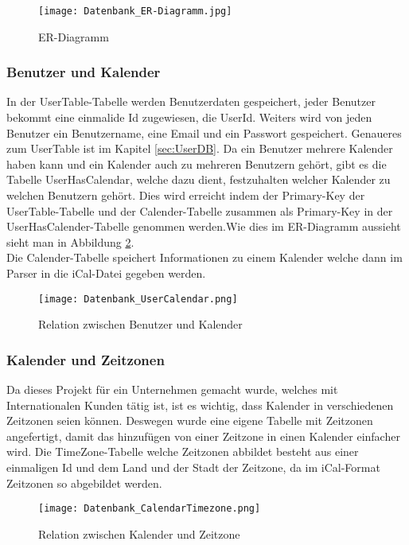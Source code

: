 \begin{figure}[H]
	\texttt{[image: Datenbank\_ER-Diagramm.jpg]}
    \caption{ER-Diagramm}
    \label{fig:erDiagramm}
\end{figure}

\subsubsection*{Benutzer und Kalender}
\label{ref:benutzerKalender}
In der UserTable-Tabelle werden Benutzerdaten gespeichert, jeder Benutzer bekommt eine einmalide Id zugewiesen, die UserId. Weiters wird von jeden Benutzer ein Benutzername, eine Email und ein Passwort gespeichert. Genaueres zum UserTable ist im Kapitel \ref{sec:UserDB}. Da ein Benutzer mehrere Kalender haben kann und ein Kalender auch zu mehreren Benutzern gehört, gibt es die Tabelle UserHasCalendar, welche dazu dient, festzuhalten welcher Kalender zu welchen Benutzern gehört. Dies wird erreicht indem der Primary-Key der UserTable-Tabelle und der Calender-Tabelle zusammen als Primary-Key in der UserHasCalender-Tabelle genommen werden.Wie dies im ER-Diagramm aussieht sieht man in Abbildung \ref{fig:userCalender}.\\
Die Calender-Tabelle speichert Informationen zu einem Kalender welche dann im Parser in die iCal-Datei gegeben werden.
\begin{figure}[H]
	\texttt{[image: Datenbank\_UserCalendar.png]}
    \caption{Relation zwischen Benutzer und Kalender}
    \label{fig:userCalender}
\end{figure}

\subsubsection*{Kalender und Zeitzonen}
\label{ref:kalenderZeitzonen}
Da dieses Projekt für ein Unternehmen gemacht wurde, welches mit Internationalen Kunden tätig ist, ist es wichtig, dass Kalender in verschiedenen Zeitzonen seien können. Deswegen wurde eine eigene Tabelle mit Zeitzonen angefertigt, damit das hinzufügen von einer Zeitzone in einen Kalender einfacher wird. Die TimeZone-Tabelle welche Zeitzonen abbildet besteht aus einer einmaligen Id und dem Land und der Stadt der Zeitzone, da im iCal-Format Zeitzonen so abgebildet werden. 
\begin{figure}[H]
	\texttt{[image: Datenbank\_CalendarTimezone.png]}
    \caption{Relation zwischen Kalender und Zeitzone}
    \label{fig:timezoneCalender}
\end{figure}

